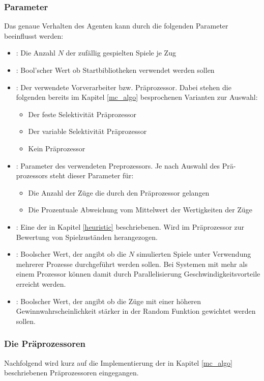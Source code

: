 \subsubsection{Parameter}
\label{mc_params}
Das genaue Verhalten des Agenten kann durch die folgenden Parameter beeinflusst werden: 
\begin{itemize}
\item {}: Die Anzahl $N$ der zufällig gespielten Spiele je Zug
\item {}: Bool'scher Wert ob Startbibliotheken verwendet werden sollen
\item {}: Der verwendete Vorverarbeiter bzw. Präprozessor. Dabei stehen die folgenden bereits im Kapitel \ref{mc_algo} besprochenen Varianten zur Auswahl:
\begin{itemize}
    \item Der feste Selektivität Präprozessor
    \item Der variable Selektivität Präprozessor
    \item Kein Präprozessor
\end{itemize}
\item {}: Parameter des verwendeten Preprozessors. Je nach Auswahl des Prä-\\prozessors steht dieser Parameter für:
\begin{itemize}
    \item Die Anzahl der Züge die durch den Präprozessor gelangen
    \item Die Prozentuale Abweichung vom Mittelwert der Wertigkeiten der Züge
\end{itemize}
\item {}: Eine der in  Kapitel \ref{heuristic} beschriebenen. Wird im Präprozessor zur Bewertung von Spielzuständen herangezogen.
\item {}: Boolscher Wert, der angibt ob die $N$ simulierten Spiele unter Verwendung mehrerer Prozesse durchgeführt werden sollen. Bei Systemen mit mehr als einem Prozessor können damit durch Parallelisierung Geschwindigkeitsvorteile erreicht werden. 
\item {}: Boolscher Wert, der angibt ob die Züge mit einer höheren Gewinnwahrscheinlichkeit stärker in der Random Funktion gewichtet werden sollen.
\end{itemize}

\subsubsection{Die Präprozessoren}
Nachfolgend wird kurz auf die Implementierung der in Kapitel \ref{mc_algo} beschriebenen Präprozessoren eingegangen.
